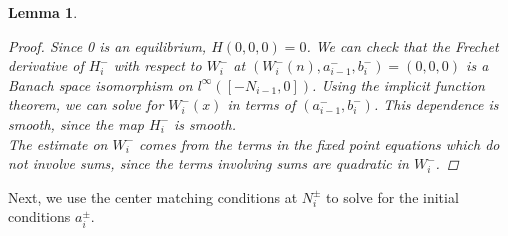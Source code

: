 \documentclass[12pt]{article}
\newtheorem{lemma}{Lemma}
\begin{document}
\begin{lemma}
\begin{proof}
Since 0 is an equilibrium, $H(0, 0, 0) = 0$. We can check that the Frechet derivative of $H_i^-$ with respect to $W_i^-$ at $(W_i^-(n), a_{i-1}^-, b_i^-) = (0, 0, 0)$ is a Banach space isomorphism on $l^\infty([-N_{i-1}, 0])$. Using the implicit function theorem, we can solve for $W_i^-(x)$ in terms of $(a_{i-1}^-, b_i^-)$. This dependence is smooth, since the map $H_i^-$ is smooth. \\

The estimate on $W_i^-$ comes from the terms in the fixed point equations which do not involve sums, since the terms involving sums are quadratic in $W_i^-$. 
\end{proof}
\end{lemma}

Next, we use the center matching conditions at $N_i^\pm$ to solve for the initial conditions $a_i^\pm$.
\end{document}

